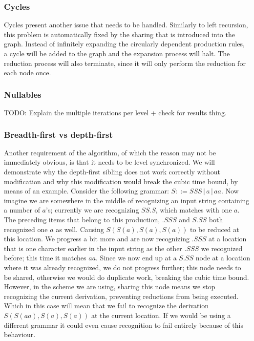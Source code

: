 \documentclass[a4paper,10pt]{article}
\begin{document}
\subsubsection{Cycles}
Cycles present another issue that needs to be handled. Similarly to left recursion, this problem is automatically fixed by the sharing that is introduced into the graph. Instead of infinitely expanding the circularly dependent production rules, a cycle will be added to the graph and the expansion process will halt. The reduction process will also terminate, since it will only perform the reduction for each node once.

\subsubsection{Nullables}

TODO: Explain the multiple iterations per level + check for results thing.

\subsubsection{Breadth-first vs depth-first}
Another requirement of the algorithm, of which the reason may not be immediately obvious, is that it needs to be level synchronized. We will demonstrate why the depth-first sibling does not work correctly without modification and why this modification would break the cubic time bound, by means of an example. Consider the following grammar: $S ::= SSS\,|\,a\,|\,aa$. Now imagine we are somewhere in the middle of recognizing an input string containing a number of $a$'s; currently we are recognizing $SS.S$, which matches with one $a$. The preceding items that belong to this production, $.SSS$ and $S.SS$ both recognized one $a$ as well. Causing $S(S(a),S(a),S(a))$ to be reduced at this location. We progress a bit more and are now recognizing $.SSS$ at a location that is one character earlier in the input string as the other $.SSS$ we recognized before; this time it matches $aa$. Since we now end up at a $S.SS$ node at a location where it was already recognized, we do not progress further; this node needs to be shared, otherwise we would do duplicate work, breaking the cubic time bound. However, in the scheme we are using, sharing this node means we stop recognizing the current derivation, preventing reductions from being executed. Which in this case will mean that we fail to recognize the derivation $S(S(aa),S(a),S(a))$ at the current location. If we would be using a different grammar it could even cause recognition to fail entirely because of this behaviour.
\end{document}
